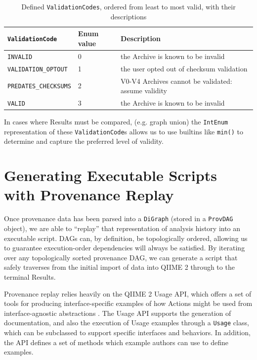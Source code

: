 \begin{table}[htp]
    \centering
    \begin{tabular}{|p{}|p{}|p{}|}
    \hline
    \texttt{ValidationCode}      & Enum value & Description                                          \\ \hline
    \texttt{INVALID}             & 0          & the Archive is known to be invalid                   \\
    \texttt{VALIDATION\_OPTOUT}  & 1          & the user opted out of checksum validation            \\
    \texttt{PREDATES\_CHECKSUMS} & 2          & V0-V4 Archives cannot be validated: assume validity  \\
    \texttt{VALID}               & 3          & the Archive is known to be invalid                   \\ \hline
    \end{tabular}
    \caption[Defined ValidationCodes, ordered from least to most valid, with their descriptions]%
    {Defined \texttt{ValidationCodes}, ordered from least to most valid, with their descriptions}
    \label{tab:validationCodes}
\end{table}

\noindent In cases where Results must be compared, (e.g. graph union) the \texttt{IntEnum}
representation of these \texttt{ValidationCode}s allows us to use builtins like \texttt{min()} to
determine and capture the preferred level of validity.


\section{Generating Executable Scripts with Provenance Replay}

Once provenance data has been parsed into a \texttt{DiGraph} (stored in a \texttt{ProvDAG}
object), we are able to “replay” that representation of analysis history into an
executable script. DAGs can, by definition, be topologically ordered, allowing
us to guarantee execution-order dependencies will always be satisfied. By
iterating over any topologically sorted provenance DAG, we can generate a script
that safely traverses from the initial import of data into QIIME 2 through to
the terminal Results.

Provenance replay relies heavily on the QIIME 2 Usage API, which offers a set of
tools for producing interface-specific examples of how Actions might be used
from interface-agnostic abstractions \parencite{qiime_2_development_team_usage_2018}.
The Usage API supports the generation of documentation, and also the execution
of Usage examples through a \texttt{Usage} class, which can be subclassed to support
specific interfaces and behaviors. In addition, the API defines a set of methods
which example authors can use to define examples.

